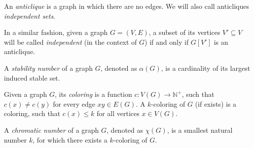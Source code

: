 \begin{defn}[anticlique]
  An \emph{anticlique} is a graph in which there are no edges. We will also call anticliques \emph{independent sets}. 
\end{defn}
In a similar fashion, given a graph $G = (V, E)$, a subset of its vertices $V' \subseteq V$ will be called \emph{independent} (in the context of $G$) if and only if $G[V']$ is an anticlique.

\begin{defn}
  A \emph{stability number} of a graph $G$, denoted as $\alpha(G)$, is a cardinality of its largest induced stable set.
\end{defn}

\begin{defn}[coloring]
  Given a graph $G$, its \emph{coloring} is a function $c: V(G) \rightarrow \mathbb{N}^+$, such that $c(x) \neq c(y)$ for every edge $xy \in E(G)$. A $k$-coloring of $G$ (if exists) is a coloring, such that $c(x) \leq k$ for all vertices $x \in V(G)$.
\end{defn}

\begin{defn}
  A \emph{chromatic number} of a graph $G$, denoted as $\chi(G)$, is a smallest natural number $k$, for which there exists a $k$-coloring of $G$.
\end{defn}




